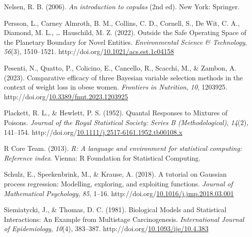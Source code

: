 \documentclass[12pt, twoside]{amherstthesis}
\newenvironment{CSLReferences}[2]%
  {}%
  {\par}
\begin{document}
\begin{CSLReferences}{1}{0}
\leavevmode{}%
Nelsen, R. B. (2006). \emph{An introduction to copulas} (2nd ed). New York: Springer.

\leavevmode{}%
Persson, L., Carney Almroth, B. M., Collins, C. D., Cornell, S., De Wit, C. A., Diamond, M. L., \ldots{} Hauschild, M. Z. (2022). Outside the {Safe} {Operating} {Space} of the {Planetary} {Boundary} for {Novel} {Entities}. \emph{Environmental Science \& Technology}, \emph{56}(3), 1510--1521. http://doi.org/\href{https://doi.org/10.1021/acs.est.1c04158}{10.1021/acs.est.1c04158}

\leavevmode{}%
Pesenti, N., Quatto, P., Colicino, E., Cancello, R., Scacchi, M., \& Zambon, A. (2023). Comparative efficacy of three {Bayesian} variable selection methods in the context of weight loss in obese women. \emph{Frontiers in Nutrition}, \emph{10}, 1203925. http://doi.org/\href{https://doi.org/10.3389/fnut.2023.1203925}{10.3389/fnut.2023.1203925}

\leavevmode{}%
Plackett, R. L., \& Hewlett, P. S. (1952). Quantal {Responses} to {Mixtures} of {Poisons}. \emph{Journal of the Royal Statistical Society: Series B (Methodological)}, \emph{14}(2), 141--154. http://doi.org/\href{https://doi.org/10.1111/j.2517-6161.1952.tb00108.x}{10.1111/j.2517-6161.1952.tb00108.x}

\leavevmode{}%
R Core Team. (2013). \emph{R: A language and environment for statistical computing: Reference index}. Vienna: R Foundation for Statistical Computing.

\leavevmode{}%
Schulz, E., Speekenbrink, M., \& Krause, A. (2018). A tutorial on {Gaussian} process regression: {Modelling}, exploring, and exploiting functions. \emph{Journal of Mathematical Psychology}, \emph{85}, 1--16. http://doi.org/\href{https://doi.org/10.1016/j.jmp.2018.03.001}{10.1016/j.jmp.2018.03.001}

\leavevmode{}%
Siemiatycki, J., \& Thomas, D. C. (1981). Biological {Models} and {Statistical} {Interactions}: An {Example} from {Multistage} {Carcinogenesis}. \emph{International Journal of Epidemiology}, \emph{10}(4), 383--387. http://doi.org/\href{https://doi.org/10.1093/ije/10.4.383}{10.1093/ije/10.4.383}


\end{CSLReferences}
\end{document}
